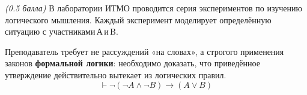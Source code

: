 \question
\textit{(0.5 балла)} В лаборатории ИТМО проводится серия экспериментов по изучению логического мышления. Каждый эксперимент моделирует определённую ситуацию с участниками А и B. 

Преподаватель требует не рассуждений «на словах», а строгого применения законов \textbf{формальной логики}: необходимо доказать, что приведённое утверждение действительно вытекает из логических правил.
$$\vdash\neg(\neg A \wedge \neg B)\rightarrow (A \vee B)$$
